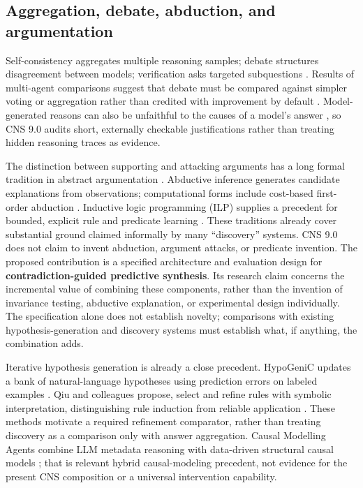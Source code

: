 \documentclass[11pt,a4paper]{article}
\begin{document}
\subsection{Aggregation, debate, abduction, and
argumentation}\label{aggregation-debate-abduction-and-argumentation}

Self-consistency aggregates multiple reasoning samples; debate
structures disagreement between models; verification asks targeted
subquestions \citep{R12, R13, R16}. Results of multi-agent comparisons
suggest that debate must be compared against simpler voting or
aggregation rather than credited with improvement by default
\citep{R14}. Model-generated reasons can also be unfaithful to the
causes of a model's answer \citep{R18}, so CNS 9.0 audits short,
externally checkable justifications rather than treating hidden
reasoning traces as evidence.

The distinction between supporting and attacking arguments has a long
formal tradition in abstract argumentation \citep{R32}. Abductive
inference generates candidate explanations from observations;
computational forms include cost-based first-order abduction
\citep{R33}. Inductive logic programming (ILP) supplies a precedent for
bounded, explicit rule and predicate learning \citep{R21}. These
traditions already cover substantial ground claimed informally by many
``discovery'' systems. CNS 9.0 does not claim to invent abduction,
argument attacks, or predicate invention. The proposed contribution is a
specified architecture and evaluation design for
\textbf{contradiction-guided predictive synthesis}. Its research claim
concerns the incremental value of combining these components, rather
than the invention of invariance testing, abductive explanation, or
experimental design individually. The specification alone does not
establish novelty; comparisons with existing hypothesis-generation and
discovery systems must establish what, if anything, the combination
adds.

Iterative hypothesis generation is already a close precedent. HypoGeniC
updates a bank of natural-language hypotheses using prediction errors on
labeled examples \citep{R37}. Qiu and colleagues propose, select and
refine rules with symbolic interpretation, distinguishing rule induction
from reliable application \citep{R38}. These methods motivate a required
refinement comparator, rather than treating discovery as a comparison
only with answer aggregation. Causal Modelling Agents combine LLM
metadata reasoning with data-driven structural causal models
\citep{R39}; that is relevant hybrid causal-modeling precedent, not
evidence for the present CNS composition or a universal intervention
capability.
\end{document}
